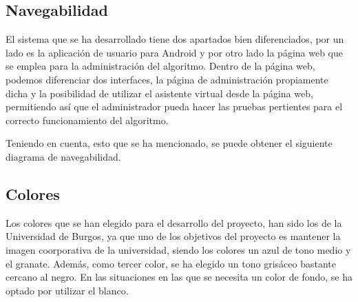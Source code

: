\newpage

\subsection{Navegabilidad}
El sistema que se ha desarrollado tiene dos apartados bien diferenciados, por un lado es la aplicación de usuario para Android y por otro lado la página web que se emplea para la administración del algoritmo. Dentro de la página web, podemos diferenciar dos interfaces, la página de administración propiamente dicha y la posibilidad de utilizar el asistente virtual desde la página web, permitiendo así que el administrador pueda hacer las pruebas pertientes para el correcto funcionamiento del algoritmo.

Teniendo en cuenta, esto que se ha mencionado, se puede obtener el siguiente diagrama de navegabilidad.


\subsection{Colores}

Los colores que se han elegido para el desarrollo del proyecto, han sido los de la Universidad de Burgos, ya que uno de los objetivos del proyecto es mantener la imagen coorporativa de la universidad, siendo los colores un azul de tono medio y el granate. Además, como tercer color, se ha elegido un tono grisáceo bastante cercano al negro. En las situaciones en las que se necesita un color de fondo, se ha optado por utilizar el blanco.

\newpage

